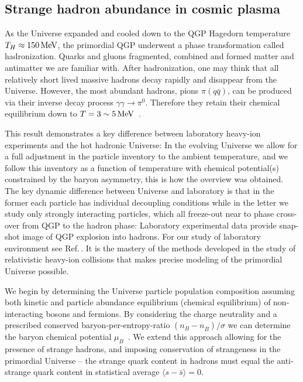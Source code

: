 \subsection{Strange hadron abundance in cosmic plasma}
\label{Strangeness}
As the Universe expanded and cooled down to the QGP Hagedorn temperature $T_H\approx150\text{\,MeV}$, the primordial QGP underwent a phase transformation called hadronization. Quarks and gluons fragmented, combined and formed matter and antimatter we are familiar with. After hadronization, one may think that all relatively short lived massive hadrons decay rapidly and disappear from the Universe. However, the most abundant hadrons, pions $\pi(q\bar q)$, can be produced via their inverse decay process $\gamma\gamma\rightarrow\pi^0$. Therefore they retain their chemical equilibrium down to $T=3\sim5\text{\,MeV}$~\cite{Kuznetsova:2008jt}. 

{\color{black} This result demonstrates a key difference between laboratory heavy-ion experiments and the hot hadronic Universe: In the evolving Universe we allow for a full adjustment in the particle inventory to the ambient temperature, and we follow this inventory as a function of temperature with chemical potential(s) constrained by the baryon asymmetry, this is how the overview  was obtained. The key dynamic difference between Universe and laboratory is that in the former each particle has individual decoupling conditions while in the letter we study only strongly interacting particles, which all freeze-out near to phase cross-over from QGP to the hadron phase: Laboratory experimental data provide snap-shot image of QGP explosion into hadrons. For our study of laboratory environment see Ref.\,\cite{Letessier:2005qe,Petran:2013qla,Rafelski:2014cqa}. It is the mastery of the methods developed in the study of relativistic heavy-ion collisions that makes precise modeling of the primordial Universe possible.}

We begin by determining the Universe particle population composition assuming both kinetic and particle abundance equilibrium (chemical equilibrium) of non-interacting bosons and fermions. By considering the charge neutrality and a prescribed conserved baryon-per-entropy-ratio ${(n_B-n_{\overline{B}})}/{\sigma}$ we can determine the baryon chemical potential $\mu_B$~\cite{Fromerth:2002wb,Fromerth:2012fe,Rafelski:2013yka}. We extend this approach allowing for the presence of strange hadrons, and imposing conservation of strangeness in the primordial Universe -- the strange quark content in hadrons must equal the anti-strange quark content in statistical average $\langle s-\bar s \rangle=0$. 


